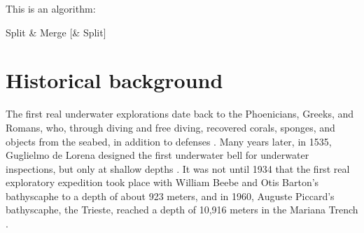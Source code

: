 This is an algorithm:
\begin{algorithm}[H]
\label{alg:SMS}
\caption{Split \& Merge [\& Split]}
\begin{algorithmic} [1]
\ELSE
{}
\ENDIF
\ENDWHILE
{}
\end{algorithmic}
\end{algorithm}


\section{Historical background}
The first real underwater explorations date back to the Phoenicians, Greeks, and Romans, who, through diving and free diving, recovered corals, sponges, and objects from the seabed, in addition to defenses \cite{erodotoStorieVsec.a.C.}.
Many years later, in 1535, Guglielmo de Lorena designed the first underwater bell for underwater inspections, but only at shallow depths \cite{eliavGuglielmosSecretEnigma2015}.
It was not until 1934 that the first real exploratory expedition took place with William Beebe and Otis Barton's bathyscaphe to a depth of about 923 meters, and in 1960, Auguste Piccard's bathyscaphe, the Trieste, reached a depth of 10,916 meters in the Mariana Trench \cite{jacquespiccardSevenMiles1961}.



